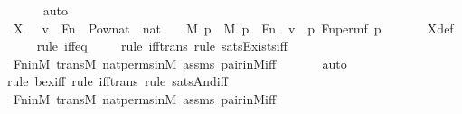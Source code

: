 \begin{isabellebody}
\ \ \ \ \isamarkupfalse%
\ auto\isanewline
\isanewline
\ \ \isamarkupfalse%
\ {\isachardoublequoteopen}X\ {\isacharequal}{\kern0pt}\ {\isacharbraceleft}{\kern0pt}\ v\ {\isasymin}\ Fn\ {\isasymtimes}\ {\isacharparenleft}{\kern0pt}Pow{\isacharparenleft}{\kern0pt}{\isacharparenleft}{\kern0pt}nat\ {\isasymtimes}\ nat{\isacharparenright}{\kern0pt}\ {\isasymtimes}\ {}{\isacharparenright}{\kern0pt}\ {\isasyminter}\ M{\isacharparenright}{\kern0pt}{\isachardot}{\kern0pt}\ {\isasymexists}p\ {\isasymin}\ M{\isachardot}{\kern0pt}\ p\ {\isasymin}\ Fn\ {\isasymand}\ v\ {\isacharequal}{\kern0pt}\ {\isacharless}{\kern0pt}p{\isacharcomma}{\kern0pt}\ Fn{\isacharunderscore}{\kern0pt}perm{\isacharparenleft}{\kern0pt}f{\isacharcomma}{\kern0pt}\ p{\isacharparenright}{\kern0pt}{\isachargreater}{\kern0pt}\ {\isacharbraceright}{\kern0pt}{\isachardoublequoteclose}\isanewline
\ \ \ \ \isamarkupfalse%
\ X{\isacharunderscore}{\kern0pt}def\ \isanewline
\ \ \ \ \isamarkupfalse%
{\isacharparenleft}{\kern0pt}rule\ iff{\isacharunderscore}{\kern0pt}eq{\isacharparenright}{\kern0pt}\isanewline
\ \ \ \ \isamarkupfalse%
{\isacharparenleft}{\kern0pt}rule\ iff{\isacharunderscore}{\kern0pt}trans{\isacharcomma}{\kern0pt}\ rule\ sats{\isacharunderscore}{\kern0pt}Exists{\isacharunderscore}{\kern0pt}iff{\isacharparenright}{\kern0pt}\isanewline
\ \ \ \ \isamarkupfalse%
\ Fn{\isacharunderscore}{\kern0pt}in{\isacharunderscore}{\kern0pt}M\ transM\ nat{\isacharunderscore}{\kern0pt}perms{\isacharunderscore}{\kern0pt}in{\isacharunderscore}{\kern0pt}M\ assms\ pair{\isacharunderscore}{\kern0pt}in{\isacharunderscore}{\kern0pt}M{\isacharunderscore}{\kern0pt}iff\isanewline
\ \ \ \ \ \isamarkupfalse%
\ auto{\isacharbrackleft}{\kern0pt}{}{\isacharbrackright}{\kern0pt}\isanewline
\ \ \ \ \isamarkupfalse%
{\isacharparenleft}{\kern0pt}rule\ bex{\isacharunderscore}{\kern0pt}iff{\isacharcomma}{\kern0pt}\ rule\ iff{\isacharunderscore}{\kern0pt}trans{\isacharcomma}{\kern0pt}\ rule\ sats{\isacharunderscore}{\kern0pt}And{\isacharunderscore}{\kern0pt}iff{\isacharparenright}{\kern0pt}\isanewline
\ \ \ \ \isamarkupfalse%
\ Fn{\isacharunderscore}{\kern0pt}in{\isacharunderscore}{\kern0pt}M\ transM\ nat{\isacharunderscore}{\kern0pt}perms{\isacharunderscore}{\kern0pt}in{\isacharunderscore}{\kern0pt}M\ assms\ pair{\isacharunderscore}{\kern0pt}in{\isacharunderscore}{\kern0pt}M{\isacharunderscore}{\kern0pt}iff\isanewline
\ \ \ \ \ \isamarkupfalse%

\end{isabellebody}
